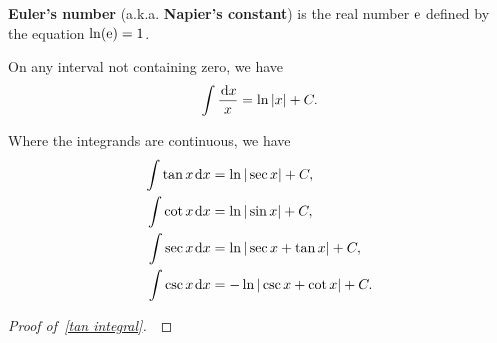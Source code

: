 \begin{definition}
\textbf{Euler's number} (a.k.a. \textbf{Napier's constant}) is the real number $\mathrm{e}$ defined by the equation $\ln(\mathrm{e})=1$.
\end{definition}

\newpage

\begin{theorem}
On any interval not containing zero, we have
\begin{equation*}
\int\frac{\mkern 2mu \mathrm{d} x}{x} = \ln|x| + C.
\end{equation*}
\end{theorem}

\begin{corollary}
Where the integrands are continuous, we have
\begin{align}
\int\tan x \mkern 2mu \mathrm{d} x &= \ln |\sec x| + C,\label{tan integral}\\
\int\cot x \mkern 2mu \mathrm{d} x &= \ln|\sin x| + C,\\
\int\sec x \mkern 2mu \mathrm{d} x &=\ln |\sec x + \tan x| + C,\\
\int\csc x \mkern 2mu \mathrm{d} x &= -\ln |\csc x + \cot x| + C.
\end{align}
\end{corollary}

\ifdefined\SOLUTION
{}
\else
\begin{proof}[Proof of~\eqref{tan integral}]\,

\vspace{5in}
\end{proof}
\fi

\newpage


